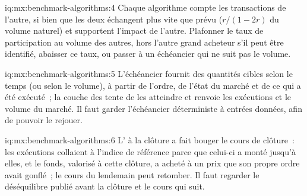 \begin{solution}{iq:mx:benchmark-algorithms:4}
Chaque algorithme compte les transactions de l'autre, si bien que les deux échangent plus vite que prévu ($r/(1-2r)$ du volume naturel) et supportent l'impact de l'autre. Plafonner le
taux de participation au volume des autres, hors l'autre grand acheteur s'il peut être identifié, abaisser ce taux, ou passer à un échéancier qui ne suit pas le volume.
\end{solution}

\begin{solution}{iq:mx:benchmark-algorithms:5}
L'échéancier fournit des quantités cibles selon le temps (ou selon le volume), à partir de l'ordre, de l'état du marché et de ce qui a été exécuté~; la couche des 
tente de les atteindre et renvoie les exécutions et le volume du marché. Il faut garder l'échéancier déterministe à entrées données, afin de pouvoir le rejouer.
\end{solution}

\begin{solution}{iq:mx:benchmark-algorithms:6}
L' à la clôture a fait bouger le cours de clôture~: les exécutions collaient à l'indice de référence parce que celui-ci a monté jusqu'à elles, et le fonds, valorisé à cette
clôture, a acheté à un prix que son propre ordre avait gonflé~; le cours du lendemain peut retomber. Il faut regarder le déséquilibre publié avant la clôture et le
cours qui suit.
\end{solution}
